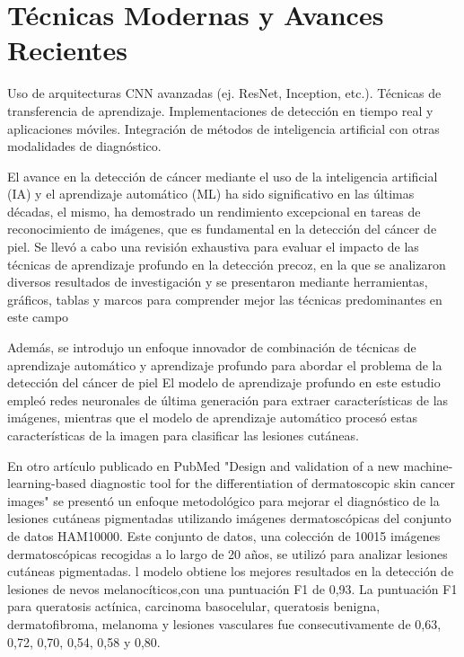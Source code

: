 \section*{Técnicas Modernas y Avances Recientes}

Uso de arquitecturas CNN avanzadas (ej. ResNet, Inception, etc.).
Técnicas de transferencia de aprendizaje.
Implementaciones de detección en tiempo real y aplicaciones móviles.
Integración de métodos de inteligencia artificial con otras modalidades de diagnóstico.



El avance en la detección de cáncer mediante el uso de la inteligencia artificial (IA) y el aprendizaje automático (ML) ha sido significativo en 
las últimas décadas, el mismo, ha demostrado un rendimiento excepcional en tareas de reconocimiento de imágenes, que es fundamental en la detección 
del cáncer de piel. Se llevó a cabo una revisión exhaustiva para evaluar el impacto de las técnicas de aprendizaje profundo en la detección precoz, 
en la que se analizaron diversos resultados de investigación y se presentaron mediante herramientas, gráficos, tablas y marcos para comprender mejor 
las técnicas predominantes en este campo %


Además, se introdujo un enfoque innovador de combinación de técnicas de aprendizaje automático y aprendizaje profundo para abordar el 
problema de la detección del cáncer de piel %
 El modelo de aprendizaje profundo en este estudio empleó redes neuronales de última generación para extraer características de las imágenes, mientras que el modelo de aprendizaje automático procesó estas características de la imagen para clasificar las lesiones cutáneas.


En otro artículo publicado en PubMed "Design and validation of a new machine-learning-based diagnostic tool for the differentiation of dermatoscopic skin cancer images" \cite{tajerian2023design}
 se presentó un enfoque metodológico para mejorar el diagnóstico de la lesiones cutáneas pigmentadas utilizando imágenes dermatoscópicas del conjunto de datos HAM10000. Este conjunto de datos, una colección de 10015 imágenes dermatoscópicas recogidas a lo largo de 20 años, se utilizó para analizar lesiones cutáneas pigmentadas. l modelo obtiene los mejores resultados en la detección de lesiones de nevos melanocíticos,con una puntuación F1 de 0,93. La puntuación F1 para queratosis actínica, carcinoma basocelular, queratosis benigna, dermatofibroma, melanoma y lesiones vasculares fue consecutivamente de 0,63, 0,72, 0,70, 0,54, 0,58 y 0,80.


